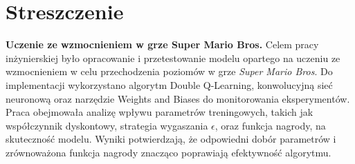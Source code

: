 \chapter*{Streszczenie}

\noindent\textbf{Uczenie ze wzmocnieniem w grze Super Mario Bros.}
Celem pracy inżynierskiej było opracowanie i przetestowanie modelu opartego na uczeniu ze wzmocnieniem w celu przechodzenia poziomów w grze \textit{Super Mario Bros}. Do implementacji wykorzystano algorytm Double Q-Learning, konwolucyjną sieć neuronową oraz narzędzie Weights and Biases do monitorowania eksperymentów. Praca obejmowała analizę wpływu parametrów treningowych, takich jak współczynnik dyskontowy, strategia wygaszania \(\epsilon\), oraz funkcja nagrody, na skuteczność modelu. Wyniki potwierdzają, że odpowiedni dobór parametrów i zrównoważona funkcja nagrody znacząco poprawiają efektywność algorytmu.
